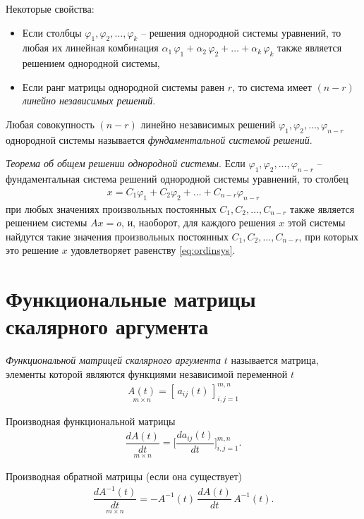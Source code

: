 \documentclass[%
	11pt,
	a4paper,
	utf8,
		]{article}
\begin{document}
Некоторые свойства:
\begin{itemize}
	\item Если столбцы $ \varphi_1, \varphi_2, \ldots, \varphi_k $ -- решения однородной системы уравнений, то любая их линейная комбинация $ \alpha_1 \, \varphi_1 + \alpha_2 \, \varphi_2 + \ldots + \alpha_k \, \varphi_k $ также является решением однородной системы,
	
	\item Если ранг матрицы однородной системы равен $ r $, то система имеет $ (n - r) $ \emph{линейно независимых решений}.
\end{itemize}

Любая совокупность $ (n - r) $ линейно независимых решений $ \varphi_1, \varphi_2, \ldots, \varphi_{n - r} $ однородной системы называется \emph{фундаментальной системой решений}.

\emph{Теорема об общем решении однородной системы}. Если $ \varphi_1, \varphi_2, \ldots, \varphi_{n - r} $ -- фундаментальная система решений однородной системы уравнений, то столбец
\begin{align}\label{eq:ordinsys}
	x = C_1 \varphi_1 + C_2 \varphi_2 + \ldots + C_{n - r} \varphi_{n - r}
\end{align}
при любых значениях произвольных постоянных $ C_1, C_2, \ldots, C_{n - r} $ также является решением системы $ A x = o $, и, наоборот, для каждого решения $ x $ этой системы найдутся такие значения произвольных постоянных $ C_1, C_2, \ldots, C_{n - r} $, при которых это решение $ x $ удовлетворяет равенству \eqref{eq:ordinsys}.

\section{Функциональные матрицы скалярного аргумента}

\emph{Функциональной матрицей скалярного аргумента} $ t $ называется матрица, элементы которой являются функциями независимой переменной $ t $
\begin{align*}
	\underset{m \times n}{A(t)} = [\, a_{ij}(t) \,]_{i,j=1}^{m,n}
\end{align*}

Производная функциональной матрицы
\begin{align*}
	\underset{m \times n}{\dfrac{d A(t)}{dt}} = \Big[ \dfrac{d a_{ij}(t) }{dt} \Big]_{i,j=1}^{m, n}.
\end{align*}

Производная обратной матрицы (если она существует)
\begin{align*}
	\underset{m \times n}{ \dfrac{d A^{-1}(t)}{dt} } = - A^{-1}(t) \,\dfrac{d A(t)}{dt} \, A^{-1}(t).
\end{align*}
\end{document}
